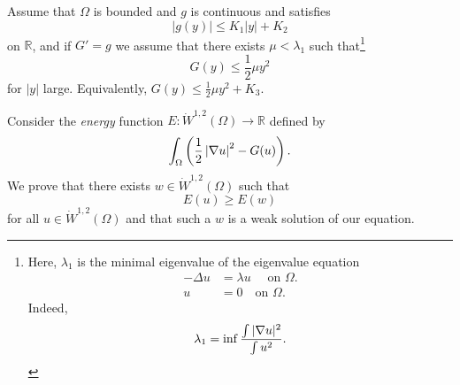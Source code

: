 \documentclass[10pt, oneside, reqno]{amsart}
\theoremstyle{plain}%
\numberwithin{equation}{section}
\theoremstyle{definition}
\theoremstyle{remark}
\newcommand{\R}{\mathbb{R}}
\begin{document}
Assume that $\Omega$ is bounded and $g$ is continuous and satisfies \[
        \left| g(y) \right| \leq K_1 | y | + K_2
    \] on $\R$, and if $G' = g$ we assume that there exists $\mu < \lambda_1$ such that\footnote{Here, $\lambda_1$ is the minimal eigenvalue of the eigenvalue equation \begin{align*}
            -\Delta u &= \lambda u \quad \text{ on $\Omega$.} \\
            u &= 0 \quad \text{on $\Omega$}.
        \end{align*}  Indeed, \[
            \lambda_1 = \inf \frac{\int |\nabla u |^2}{\int u^2}.
        \]
        } \[
        G(y) \leq \frac{1}{2} \mu y^2 
    \]  for $|y|$ large.   Equivalently, $G(y) \leq \frac{1}{2} \mu y^2 + K_3$.

Consider the \emph{energy} function $E: \dot W^{1, 2}(\Omega) \rightarrow \R$ defined by \begin{equation}
    \label{eq:energy}
    \int_\Omega \left( \frac{1}{2} \left| \nabla u \right|^2 - G(u) \right).
\end{equation}  We prove that there exists $w \in \dot W^{1, 2}(\Omega)$ such that \[
    E(u) \geq E(w)
\] for all $u \in \dot W^{1, 2}(\Omega)$ and that such a $w$ is a weak solution of our equation.  
\end{document}
